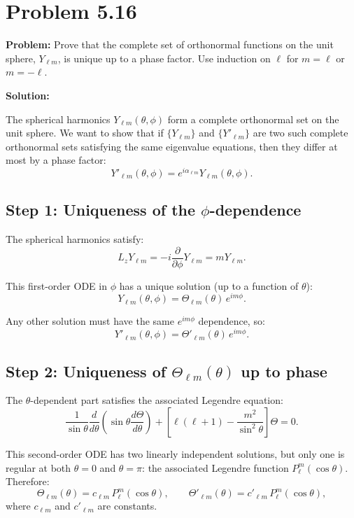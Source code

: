 \documentclass[12pt]{article}
\begin{document}
\section*{Problem 5.16}

\textbf{Problem:} Prove that the complete set of orthonormal functions on the unit sphere, $Y_{\ell m}$, is unique up to a phase factor. Use induction on $\ell$ for $m = \ell$ or $m = -\ell$.

\bigskip
\textbf{Solution:}

The spherical harmonics $Y_{\ell m}(\theta, \phi)$ form a complete orthonormal set on the unit sphere. We want to show that if $\{Y_{\ell m}\}$ and $\{Y'_{\ell m}\}$ are two such complete orthonormal sets satisfying the same eigenvalue equations, then they differ at most by a phase factor:
\[
Y'_{\ell m}(\theta, \phi) = e^{i\alpha_{\ell m}} Y_{\ell m}(\theta, \phi).
\]

\subsection*{Step 1: Uniqueness of the $\phi$-dependence}

The spherical harmonics satisfy:
\[
L_z Y_{\ell m} = -i\frac{\partial}{\partial\phi}Y_{\ell m} = m Y_{\ell m}.
\]

This first-order ODE in $\phi$ has a unique solution (up to a function of $\theta$):
\[
Y_{\ell m}(\theta, \phi) = \Theta_{\ell m}(\theta)\,e^{im\phi}.
\]

Any other solution must have the same $e^{im\phi}$ dependence, so:
\[
Y'_{\ell m}(\theta, \phi) = \Theta'_{\ell m}(\theta)\,e^{im\phi}.
\]

\subsection*{Step 2: Uniqueness of $\Theta_{\ell m}(\theta)$ up to phase}

The $\theta$-dependent part satisfies the associated Legendre equation:
\[
\frac{1}{\sin\theta}\frac{d}{d\theta}\left(\sin\theta\frac{d\Theta}{d\theta}\right) + \left[\ell(\ell+1) - \frac{m^2}{\sin^2\theta}\right]\Theta = 0.
\]

This second-order ODE has two linearly independent solutions, but only one is regular at both $\theta = 0$ and $\theta = \pi$: the associated Legendre function $P_\ell^m(\cos\theta)$. Therefore:
\[
\Theta_{\ell m}(\theta) = c_{\ell m}\,P_\ell^m(\cos\theta), \qquad \Theta'_{\ell m}(\theta) = c'_{\ell m}\,P_\ell^m(\cos\theta),
\]
where $c_{\ell m}$ and $c'_{\ell m}$ are constants.
\end{document}
